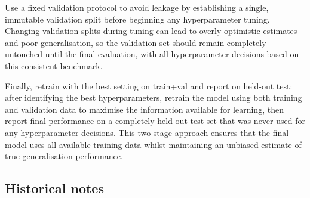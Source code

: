 Use a fixed validation protocol to avoid leakage by establishing a single, immutable validation split before beginning any hyperparameter tuning. Changing validation splits during tuning can lead to overly optimistic estimates and poor generalisation, so the validation set should remain completely untouched until the final evaluation, with all hyperparameter decisions based on this consistent benchmark.

Finally, retrain with the best setting on train+val and report on held-out test: after identifying the best hyperparameters, retrain the model using both training and validation data to maximise the information available for learning, then report final performance on a completely held-out test set that was never used for any hyperparameter decisions. This two-stage approach ensures that the final model uses all available training data whilst maintaining an unbiased estimate of true generalisation performance.




\subsection{Historical notes}

